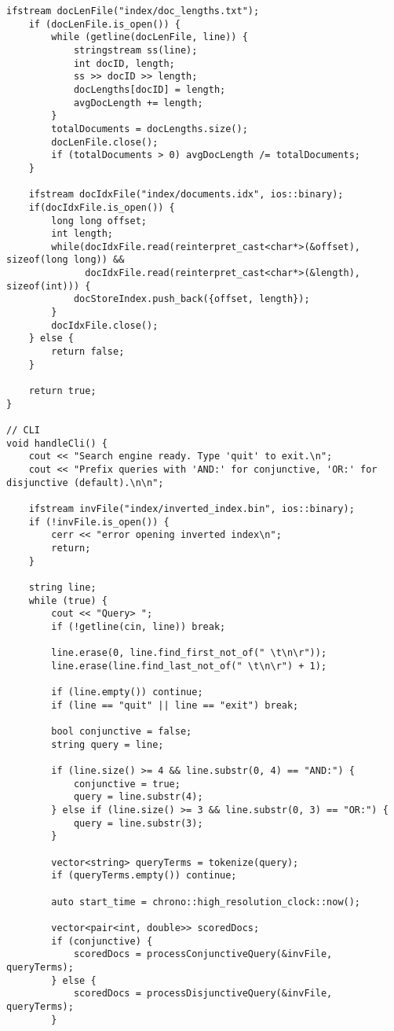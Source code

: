 \documentclass{article}
\begin{document}
\begin{lstlisting}[caption={The complete source code for the query processor component.}, label={lst:query}]
    ifstream docLenFile("index/doc_lengths.txt");
    if (docLenFile.is_open()) {
        while (getline(docLenFile, line)) {
            stringstream ss(line);
            int docID, length;
            ss >> docID >> length;
            docLengths[docID] = length;
            avgDocLength += length;
        }
        totalDocuments = docLengths.size();
        docLenFile.close();
        if (totalDocuments > 0) avgDocLength /= totalDocuments;
    }
    
    ifstream docIdxFile("index/documents.idx", ios::binary);
    if(docIdxFile.is_open()) {
        long long offset;
        int length;
        while(docIdxFile.read(reinterpret_cast<char*>(&offset), sizeof(long long)) && 
              docIdxFile.read(reinterpret_cast<char*>(&length), sizeof(int))) {
            docStoreIndex.push_back({offset, length});
        }
        docIdxFile.close();
    } else {
        return false;
    }
    
    return true;
}

// CLI
void handleCli() {
    cout << "Search engine ready. Type 'quit' to exit.\n";
    cout << "Prefix queries with 'AND:' for conjunctive, 'OR:' for disjunctive (default).\n\n";
    
    ifstream invFile("index/inverted_index.bin", ios::binary);
    if (!invFile.is_open()) {
        cerr << "error opening inverted index\n";
        return;
    }
    
    string line;
    while (true) {
        cout << "Query> ";
        if (!getline(cin, line)) break;
        
        line.erase(0, line.find_first_not_of(" \t\n\r"));
        line.erase(line.find_last_not_of(" \t\n\r") + 1);
        
        if (line.empty()) continue;
        if (line == "quit" || line == "exit") break;
        
        bool conjunctive = false;
        string query = line;
        
        if (line.size() >= 4 && line.substr(0, 4) == "AND:") {
            conjunctive = true;
            query = line.substr(4);
        } else if (line.size() >= 3 && line.substr(0, 3) == "OR:") {
            query = line.substr(3);
        }
        
        vector<string> queryTerms = tokenize(query);
        if (queryTerms.empty()) continue;
        
        auto start_time = chrono::high_resolution_clock::now();
        
        vector<pair<int, double>> scoredDocs;
        if (conjunctive) {
            scoredDocs = processConjunctiveQuery(&invFile, queryTerms);
        } else {
            scoredDocs = processDisjunctiveQuery(&invFile, queryTerms);
        }
        

\end{lstlisting}
\end{document}
